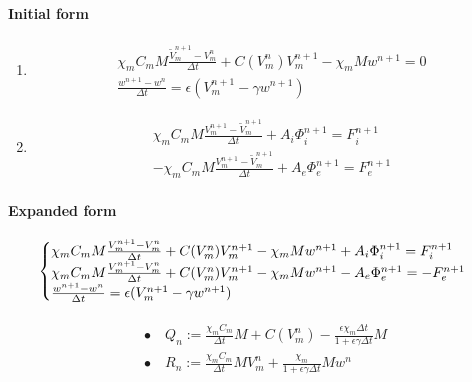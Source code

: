 \documentclass[a4paper]{article}
\begin{document}
\paragraph{Initial form}
\begin{enumerate}[label = \Roman*, align = Center]
	\item 
	\begin{equation}
	\begin{gathered}
	\chi_m C_m M \frac{\tilde{V}_m^{n+1}-V_m^n}{\Delta t} +  C(V_m^n) V_m^{n+1} - \chi_m M w^{n+1}= 0
	\\
	 \frac{w^{n+1} - w^n}{\Delta t} = \epsilon (V_m^{n+1}-\gamma w^{n+1})
	\end{gathered}
	\end{equation}
	\item 
	\begin{equation}
	\begin{gathered}
	\chi_m C_m M \frac{V_m^{n+1}-\tilde{V}_m^{n+1}}{\Delta t} + A_i \Phi_i^{n+1}= F_i^{n+1}
	\\
	- \chi_m C_m M \frac{V_m^{n+1}-\tilde{V}_m^{n+1}}{\Delta t} + A_e \Phi_e^{n+1}= F_e^{n+1}
	\end{gathered}
	\end{equation}
	
\end{enumerate}
\vspace{5mm}
\paragraph{Expanded form}
\begin{equation}
\vspace{5mm}
\begin{cases}
\chi_m C_m M \frac{V_m^{n+1}-V_m^{n}}{\Delta t} + C(V_m^n) V_m^{n+1} - \chi_m M w^{n+1} + A_i \Phi_i ^{n+1} = F_i^{n+1} \\
\chi_m C_m M \frac{V_m^{n+1}-V_m^{n}}{\Delta t} +  C(V_m^n) V_m^{n+1} - \chi_m M w^{n+1} - A_e \Phi_e ^{n+1} =  -F_e^{n+1} \\
\frac{w^{n+1}-w^{n}}{\Delta t} = \epsilon(V_m^{n+1}-\gamma w^{n+1})
\end{cases}
\end{equation}

 \begin{equation}
 \begin{gathered}
 \begin{aligned}
 & \bullet \quad Q_n := \frac{\chi_m C_m}{\Delta t}M + C(V_m^n) - \frac{\epsilon\chi_m \Delta t}{1 + \epsilon \gamma \Delta t} M \\
 & \bullet \quad R_n := \frac{\chi_mC_m}{\Delta t}MV_m^n + \frac{\chi_m}{1+\epsilon\gamma\Delta t}M w^n
 \end{aligned}
 \end{gathered}
\end{equation}
\end{document}
